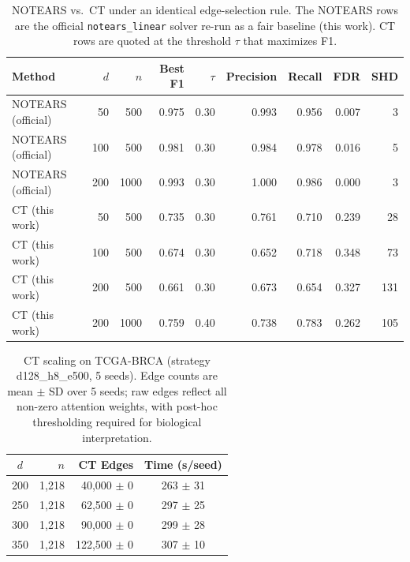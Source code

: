 \documentclass[12pt,a4paper]{article}
\begin{document}
\newpage
\begin{table}[H]
\centering
\caption{NOTEARS vs.\ CT under an identical edge-selection rule. The NOTEARS rows are the official \texttt{notears\_linear} solver re-run as a fair baseline (this work). CT rows are quoted at the threshold $\tau$ that maximizes F1.}
\label{tab:baseline}
\begin{tabular}{lrrrrrrrr}
\toprule
Method & $d$ & $n$ & Best F1 & $\tau$ & Precision & Recall & FDR & SHD \\
\midrule
NOTEARS (official) & 50 & 500 & 0.975 & 0.30 & 0.993 & 0.956 & 0.007 & 3 \\
NOTEARS (official) & 100 & 500 & 0.981 & 0.30 & 0.984 & 0.978 & 0.016 & 5 \\
NOTEARS (official) & 200 & 1000 & 0.993 & 0.30 & 1.000 & 0.986 & 0.000 & 3 \\
\midrule
CT (this work)     & 50 & 500 & 0.735 & 0.30 & 0.761 & 0.710 & 0.239 & 28 \\
CT (this work)     & 100 & 500 & 0.674 & 0.30 & 0.652 & 0.718 & 0.348 & 73 \\
CT (this work)     & 200 & 500 & 0.661 & 0.30 & 0.673 & 0.654 & 0.327 & 131 \\
CT (this work)     & 200 & 1000 & 0.759 & 0.40 & 0.738 & 0.783 & 0.262 & 105 \\
\bottomrule
\end{tabular}
\end{table}
\newpage
\begin{table}[H]
\centering
\caption{CT scaling on TCGA-BRCA (strategy d128\_h8\_e500, 5 seeds). Edge counts are mean $\pm$ SD over 5 seeds; raw edges reflect all non-zero attention weights, with post-hoc thresholding required for biological interpretation.}
\label{tab:midrange}
\begin{tabular}{crrc}
\toprule
$d$ & $n$ & CT Edges & Time (s/seed) \\
\midrule
200 & 1,218 & 40,000 $\pm$ 0 & 263 $\pm$ 31 \\
250 & 1,218 & 62,500 $\pm$ 0 & 297 $\pm$ 25 \\
300 & 1,218 & 90,000 $\pm$ 0 & 299 $\pm$ 28 \\
350 & 1,218 & 122,500 $\pm$ 0 & 307 $\pm$ 10 \\
\bottomrule
\end{tabular}
\end{table}
\newpage
\end{document}
